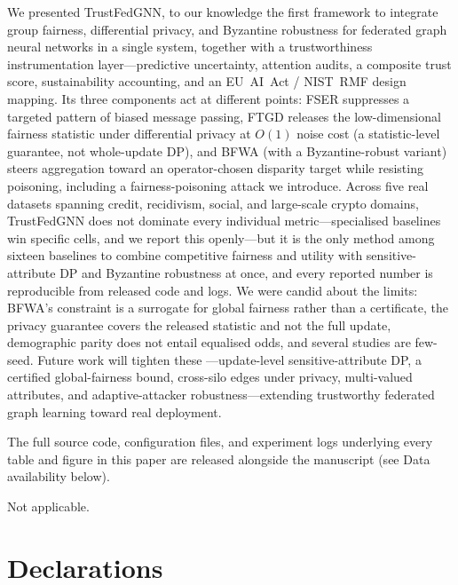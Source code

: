 \documentclass[pdflatex,sn-mathphys-num]{sn-jnl}
\theoremstyle{thmstyleone}%
\theoremstyle{thmstyletwo}%
\theoremstyle{thmstylethree}%
\begin{document}
We presented TrustFedGNN, to our knowledge the first framework to integrate
group fairness, differential privacy, and Byzantine robustness for federated
graph neural networks in a single system, together with a trustworthiness
instrumentation layer---predictive uncertainty, attention audits, a composite
trust score, sustainability accounting, and an EU~AI~Act / NIST~RMF design
mapping. Its three components act at different points: FSER suppresses a
targeted pattern of biased message passing, FTGD releases the low-dimensional
fairness statistic under differential privacy at $O(1)$ noise cost (a
statistic-level guarantee, not whole-update DP), and BFWA (with a
Byzantine-robust variant) steers aggregation toward an operator-chosen disparity
target while resisting poisoning, including a fairness-poisoning attack we
introduce. Across five real datasets spanning credit, recidivism, social, and
large-scale crypto domains, TrustFedGNN does not dominate every individual
metric---specialised baselines win specific cells, and we report this
openly---but it is the only method among sixteen baselines to combine
competitive fairness and utility with sensitive-attribute DP and Byzantine
robustness at once, and every reported number is reproducible from released code
and logs. We were candid about the limits: BFWA's constraint is a surrogate for
global fairness rather than a certificate, the privacy guarantee covers the
released statistic and not the full update, demographic parity does not entail
equalised odds, and several studies are few-seed. Future work will tighten these
---update-level sensitive-attribute DP, a certified global-fairness bound,
cross-silo edges under privacy, multi-valued attributes, and adaptive-attacker
robustness---extending trustworthy federated graph learning toward real
deployment.


\backmatter

The full source code, configuration files, and experiment logs underlying
every table and figure in this paper are released alongside the manuscript
(see Data availability below).

Not applicable.

\section*{Declarations}
\end{document}
